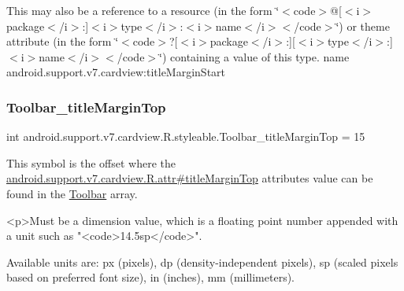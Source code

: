 This may also be a reference to a resource (in the form \char`\"{}$<$code$>$@\mbox{[}$<$i$>$package$<$/i$>$\+:\mbox{]}$<$i$>$type$<$/i$>$\+:$<$i$>$name$<$/i$>$$<$/code$>$\char`\"{}) or theme attribute (in the form \char`\"{}$<$code$>$?\mbox{[}$<$i$>$package$<$/i$>$\+:\mbox{]}\mbox{[}$<$i$>$type$<$/i$>$\+:\mbox{]}$<$i$>$name$<$/i$>$$<$/code$>$\char`\"{}) containing a value of this type.  name android.\+support.\+v7.\+cardview\+:title\+Margin\+Start \mbox{\label{classandroid_1_1support_1_1v7_1_1cardview_1_1R_1_1styleable_ad27fec87a488036b64111605f95749ac}} 
\subsubsection{\texorpdfstring{Toolbar\+\_\+title\+Margin\+Top}{Toolbar\_titleMarginTop}}
{\footnotesize\ttfamily int android.\+support.\+v7.\+cardview.\+R.\+styleable.\+Toolbar\+\_\+title\+Margin\+Top = 15\hspace{0.3cm}{\ttfamily [static]}}

This symbol is the offset where the \hyperlink{classandroid_1_1support_1_1v7_1_1cardview_1_1R_1_1attr_a50fe0b534598095ab1c78c567cd09649}{android.\+support.\+v7.\+cardview.\+R.\+attr\#title\+Margin\+Top} attribute\textquotesingle{}s value can be found in the \hyperlink{classandroid_1_1support_1_1v7_1_1cardview_1_1R_1_1styleable_a26149aeb8fd339abe09ecc9d92b9304f}{Toolbar} array.

\begin{DoxyVerb}      <p>Must be a dimension value, which is a floating point number appended with a unit such as "<code>14.5sp</code>".
\end{DoxyVerb}
 Available units are\+: px (pixels), dp (density-\/independent pixels), sp (scaled pixels based on preferred font size), in (inches), mm (millimeters). 

